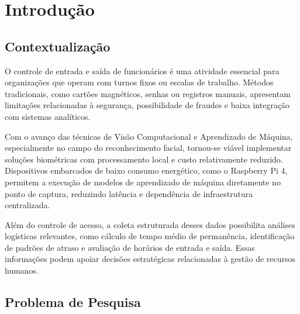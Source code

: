 \documentclass[12pt,a4paper]{report}
\begin{document}

\tableofcontents
\newpage

\listoffigures
\newpage

\listoftables
\newpage


\chapter{Introdução}

\section{Contextualização}

O controle de entrada e saída de funcionários é uma atividade essencial para organizações que operam com turnos fixos ou escalas de trabalho. Métodos tradicionais, como cartões magnéticos, senhas ou registros manuais, apresentam limitações relacionadas à segurança, possibilidade de fraudes e baixa integração com sistemas analíticos.

Com o avanço das técnicas de Visão Computacional e Aprendizado de Máquina, especialmente no campo do reconhecimento facial, tornou-se viável implementar soluções biométricas com processamento local e custo relativamente reduzido. Dispositivos embarcados de baixo consumo energético, como o Raspberry Pi 4, permitem a execução de modelos de aprendizado de máquina diretamente no ponto de captura, reduzindo latência e dependência de infraestrutura centralizada.

Além do controle de acesso, a coleta estruturada desses dados possibilita análises logísticas relevantes, como cálculo de tempo médio de permanência, identificação de padrões de atraso e avaliação de horários de entrada e saída. Essas informações podem apoiar decisões estratégicas relacionadas à gestão de recursos humanos.

\section{Problema de Pesquisa}
\end{document}
